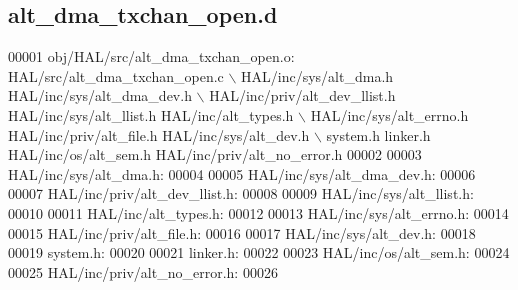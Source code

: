 \subsection{alt\+\_\+dma\+\_\+txchan\+\_\+open.\+d}
\label{alt__dma__txchan__open_8d_source}

\begin{DoxyCode}
00001 obj/HAL/src/alt_dma_txchan_open.o: HAL/src/alt_dma_txchan_open.c \(\backslash\)
 HAL/inc/sys/alt\_dma.h HAL/inc/sys/alt\_dma\_dev.h \(\backslash\)
 HAL/inc/priv/alt_dev_llist.h HAL/inc/sys/alt_llist.h HAL/inc/alt\_types.h \(\backslash\)
 HAL/inc/sys/alt_errno.h HAL/inc/priv/alt\_file.h HAL/inc/sys/alt_dev.h \(\backslash\)
 system.h linker.h HAL/inc/os/alt\_sem.h HAL/inc/priv/alt_no_error.h
00002 
00003 HAL/inc/sys/alt\_dma.h:
00004 
00005 HAL/inc/sys/alt\_dma\_dev.h:
00006 
00007 HAL/inc/priv/alt_dev_llist.h:
00008 
00009 HAL/inc/sys/alt_llist.h:
00010 
00011 HAL/inc/alt\_types.h:
00012 
00013 HAL/inc/sys/alt_errno.h:
00014 
00015 HAL/inc/priv/alt\_file.h:
00016 
00017 HAL/inc/sys/alt_dev.h:
00018 
00019 system.h:
00020 
00021 linker.h:
00022 
00023 HAL/inc/os/alt\_sem.h:
00024 
00025 HAL/inc/priv/alt_no_error.h:
00026 \end{DoxyCode}
